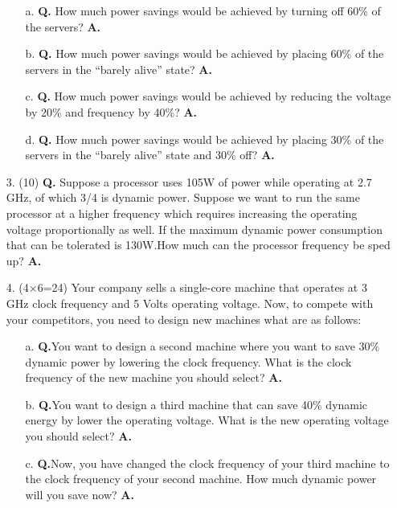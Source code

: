 \documentclass[main.tex]{subfiles}
\begin{document}
\begin{enumerate}
    \begin{enumerate}
        \item [a.] \textbf{Q.} How much power savings would be achieved by turning off 60\% of the servers? \textbf{A.}
        
        \item [b.] \textbf{Q.} How much power savings would be achieved by placing 60\% of the servers in the “barely alive” state? \textbf{A.}
        
        \item [c.] \textbf{Q.} How much power savings would be achieved by reducing the voltage by 20\% and frequency by 40\%? \textbf{A.}
        
        \item [d.] \textbf{Q.} How much power savings would be achieved by placing 30\% of the servers in the “barely alive” state and 30\% off? \textbf{A.}
    \end{enumerate}

    \item [3.] (10) \textbf{Q.} Suppose a processor uses 105W of power while operating at 2.7 GHz, of which 3/4 is dynamic power. Suppose we want to run the same processor at a higher frequency which requires increasing the operating voltage proportionally as well. If the maximum dynamic power consumption that can be tolerated is 130W.How much can the processor frequency be sped up? \textbf{A.}

    \item [4.] (4×6=24) Your company sells a single-core machine that operates at 3 GHz clock frequency and 5 Volts operating voltage. Now, to compete with your competitors, you need to design new machines what are as follows:

    \begin{enumerate}
        \item [a.] \textbf{Q.}You want to design a second machine where you want to save 30\% dynamic power by lowering the clock frequency. What is the clock frequency of the new machine you should select? \textbf{A.}

        \item [b.] \textbf{Q.}You want to design a third machine that can save 40\% dynamic energy by lower the operating voltage. What is the new operating voltage you should select? \textbf{A.}

        \item [c.] \textbf{Q.}Now, you have changed the clock frequency of your third machine to the clock frequency of your second machine. How much dynamic power will you save now? \textbf{A.}


\end{enumerate}
\end{enumerate}
\end{document}

